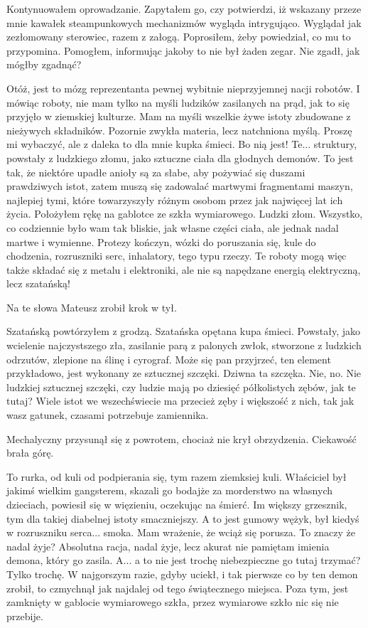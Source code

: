 Kontynuowałem oprowadzanie.
Zapytałem go, czy potwierdzi, iż wskazany przeze mnie kawałek steampunkowych mechanizmów wygląda intrygująco.
Wyglądał jak zezłomowany sterowiec, razem z załogą.
Poprosiłem, żeby powiedział, co mu to przypomina. Pomogłem, informując jakoby to nie był żaden zegar.
Nie zgadł, jak mógłby zgadnąć?
\begin{dialogue}
\ds{} Otóż, jest to mózg reprezentanta pewnej wybitnie nieprzyjemnej nacji robotów.
I mówiąc roboty, nie mam tylko na myśli ludzików zasilanych na prąd, jak to się przyjęło w ziemskiej kulturze.
Mam na myśli wszelkie żywe istoty zbudowane z nieżywych składników. Pozornie zwykła materia, lecz natchniona myślą.
\ds{} Proszę mi wybaczyć, ale z daleka to dla mnie kupka śmieci.
\ds{} Bo nią jest!
Te... struktury, powstały z ludzkiego złomu, jako sztuczne ciała dla głodnych demonów.
To jest tak, że niektóre upadłe anioły są za słabe, aby pożywiać się duszami prawdziwych istot, 
zatem muszą się zadowalać martwymi fragmentami maszyn, najlepiej tymi, które towarzyszyły różnym osobom przez jak najwięcej lat ich życia.
\dm{} Położyłem rękę na gablotce ze szkła wymiarowego. \dm{}
Ludzki złom. Wszystko, co codziennie było wam tak bliskie, jak własne części ciała, ale jednak nadal martwe i wymienne. 
Protezy kończyn, wózki do poruszania się, kule do chodzenia, rozruszniki serc, inhalatory, tego typu rzeczy.
Te roboty mogą więc także składać się z metalu i elektroniki, ale nie są napędzane energią elektryczną, lecz szatańską!
\end{dialogue}
Na te słowa Mateusz zrobił krok w tył.
\begin{dialogue}
\ds{} Szatańską \dm{} powtórzyłem z grodzą. \dm{} Szatańska opętana kupa śmieci.
Powstały, jako wcielenie najczystszego zła, zasilanie parą z palonych zwłok, stworzone z ludzkich odrzutów, zlepione na ślinę i cyrograf.
Może się pan przyjrzeć, ten element przykładowo, jest wykonany ze sztucznej szczęki.
\ds{} Dziwna ta szczęka.
\ds{} Nie, no. Nie ludzkiej sztucznej szczęki, czy ludzie mają po dziesięć półkolistych zębów, jak te tutaj?
Wiele istot we wszechświecie ma przecież zęby i większość z nich, tak jak wasz gatunek, czasami potrzebuje zamiennika.
\end{dialogue}
Mechalyczny przysunął się z powrotem, chociaż nie krył obrzydzenia. Ciekawość brała górę.
\begin{dialogue}
\ds{} To rurka, od kuli od podpierania się, tym razem ziemksiej kuli. 
Właściciel był jakimś wielkim gangsterem, skazali go bodajże za morderstwo na własnych dzieciach, powiesił się w więzieniu, oczekując na śmierć.
Im większy grzesznik, tym dla takiej diabelnej istoty smaczniejszy.
A to jest gumowy wężyk, był kiedyś w rozruszniku serca... smoka.
\ds{} Mam wrażenie, że wciąż się porusza. To znaczy że nadal żyje?
\ds{} Absolutna racja, nadal żyje, lecz akurat nie pamiętam imienia demona, który go zasila.
\ds{} A... a to nie jest trochę niebezpieczne go tutaj trzymać?
\ds{} Tylko trochę. W najgorszym razie, gdyby uciekł, i tak pierwsze co by ten demon zrobił, to czmychnął jak najdalej od tego świątecznego miejsca. 
Poza tym, jest zamknięty w gablocie wymiarowego szkła, przez wymiarowe szkło nic się nie przebije.
\end{dialogue}

